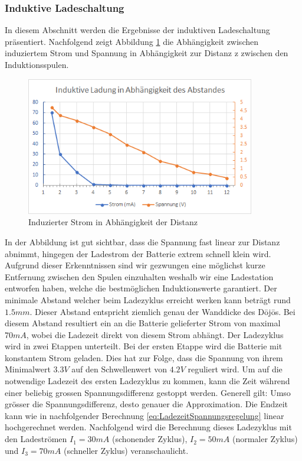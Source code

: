 \subsubsection*{Induktive Ladeschaltung}\label{sec:batterie}
In diesem Abschnitt werden die Ergebnisse der induktiven Ladeschaltung präsentiert. Nachfolgend zeigt Abbildung \ref{fig:InduzierterStrom} die Abhängigkeit zwischen induziertem Strom und Spannung in Abhängigkeit zur Distanz z zwischen den Induktionsspulen.

\begin{figure}[H]
	\begin{center}
		\includegraphics[width=100mm]{data/InduktiveLadung.png}
		\caption[Induzierter Strom in Abhängigkeit der Distanz]{Induzierter Strom in Abhängigkeit der Distanz} %
		\label{fig:InduzierterStrom}
	\end{center}
\end{figure}

In der Abbildung ist gut sichtbar, dass die Spannung fast linear zur Distanz abnimmt, hingegen der Ladestrom der Batterie extrem schnell klein wird. Aufgrund dieser Erkenntnissen sind wir gezwungen eine möglichst kurze Entfernung zwischen den Spulen einzuhalten weshalb wir eine Ladestation entworfen haben, welche die bestmöglichen Induktionswerte garantiert. Der minimale Abstand welcher beim Ladezyklus erreicht werken kann beträgt rund $1.5mm$. Dieser Abstand entspricht ziemlich genau der Wanddicke des Dōjōs. Bei diesem Abstand resultiert ein an die Batterie gelieferter Strom von maximal $70mA$, wobei die Ladezeit direkt von diesem Strom abhängt. Der Ladezyklus wird in zwei Etappen unterteilt. Bei der ersten Etappe wird die Batterie mit konstantem Strom geladen. Dies hat zur Folge, dass die Spannung von ihrem Minimalwert $3.3V$ auf den Schwellenwert von $4.2V$ reguliert wird. Um auf die notwendige Ladezeit des ersten Ladezyklus zu kommen, kann die Zeit während einer beliebig grossen Spannungsdifferenz gestoppt werden. Generell gilt: Umso grösser die Spannungsdifferenz, desto genauer die Approximation. Die Endzeit kann wie in nachfolgender Berechnung \ref{eq:LadezeitSpannungsregelung} linear hochgerechnet werden. Nachfolgend wird die Berechnung dieses Ladezyklus mit den Ladeströmen $I_{1}=30mA$ (schonender Zyklus), $I_{2}=50mA$ (normaler Zyklus) und $I_{3}=70mA$ (schneller Zyklus) veranschaulicht. 


